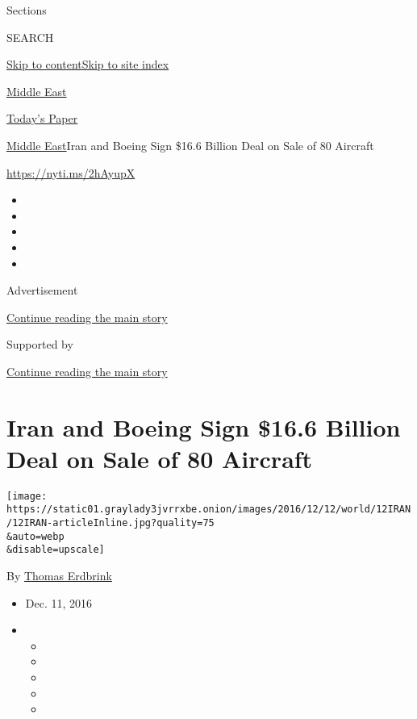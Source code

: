 Sections

SEARCH

\protect\hyperlink{site-content}{Skip to
content}\protect\hyperlink{site-index}{Skip to site index}

\href{https://www.nytimes3xbfgragh.onion/section/world/middleeast}{Middle
East}

\href{https://myaccount.nytimes3xbfgragh.onion/auth/login?response_type=cookie\&client_id=vi}{}

\href{https://www.nytimes3xbfgragh.onion/section/todayspaper}{Today's
Paper}

\href{/section/world/middleeast}{Middle East}\textbar{}Iran and Boeing
Sign \$16.6 Billion Deal on Sale of 80 Aircraft

\url{https://nyti.ms/2hAyupX}

\begin{itemize}
\item
\item
\item
\item
\item
\end{itemize}

Advertisement

\protect\hyperlink{after-top}{Continue reading the main story}

Supported by

\protect\hyperlink{after-sponsor}{Continue reading the main story}

\hypertarget{iran-and-boeing-sign-166-billion-deal-on-sale-of-80-aircraft}{%
\section{Iran and Boeing Sign \$16.6 Billion Deal on Sale of 80
Aircraft}\label{iran-and-boeing-sign-166-billion-deal-on-sale-of-80-aircraft}}

\texttt{[image: https://static01.graylady3jvrrxbe.onion/images/2016/12/12/world/12IRAN/12IRAN-articleInline.jpg?quality=75\\\&auto=webp\\\&disable=upscale]}

By \href{http://www.nytimes3xbfgragh.onion/by/thomas-erdbrink}{Thomas
Erdbrink}

\begin{itemize}
\item
  Dec. 11, 2016
\item
  \begin{itemize}
  \item
  \item
  \item
  \item
  \item
  \end{itemize}
\end{itemize}

